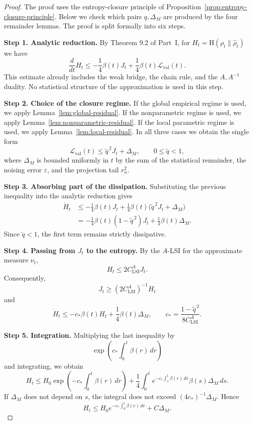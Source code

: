 \documentclass{article}
\newcommand{\Ent}{\mathrm H}
\newcommand{\Eval}{\mathcal L_{\mathrm{val}}}
\begin{document}
\begin{proof}
The proof uses the entropy-closure principle of Proposition~\ref{prop:entropy-closure-principle}. Below we check which pairs \(q,\Delta_M\) are produced by the four remainder lemmas. The proof is split formally into six steps.

\smallskip
\noindent\textbf{Step 1. Analytic reduction.}
By Theorem 9.2 of Part~I, for \(H_t=\Ent(\rho_t\|\hat\rho_t)\) we have
\[
        \frac{d}{dt}H_t
        \le
        -\frac14\beta(t)J_t+\frac14\beta(t)\Eval(t).
\]
This estimate already includes the weak bridge, the chain rule, and the
\(A,A^{-1}\) duality. No statistical structure of the approximation is used in this
step.

\smallskip
\noindent\textbf{Step 2. Choice of the closure regime.}
If the global empirical regime is used, we apply
Lemma~\ref{lem:global-residual}. If the nonparametric regime is used, we apply
Lemma~\ref{lem:nonparametric-residual}. If the local parametric regime is used, we
apply Lemma~\ref{lem:local-residual}. In all three cases we obtain the single form
\[
        \Eval(t)\le \widetilde q^{\,2}J_t+\Delta_M,
        \qquad 0\le \widetilde q<1,
\]
where \(\Delta_M\) is bounded uniformly in \(t\) by the sum of the statistical
remainder, the noising error \(\varepsilon\), and the projection tail \(r_n^2\).

\smallskip
\noindent\textbf{Step 3. Absorbing part of the dissipation.}
Substituting the previous inequality into the analytic reduction gives
\[
\begin{aligned}
        \dot H_t
        &\le
        -\frac14\beta(t)J_t
        +\frac14\beta(t)\bigl(\widetilde q^{\,2}J_t+\Delta_M\bigr)\\
        &=-\frac14\beta(t)(1-\widetilde q^{\,2})J_t
        +\frac14\beta(t)\Delta_M .
\end{aligned}
\]
Since \(\widetilde q<1\), the first term remains strictly dissipative.

\smallskip
\noindent\textbf{Step 4. Passing from \(J_t\) to the entropy.}
By the \(A\)-LSI for the approximate measure \(\hat\nu_t\),
\[
        H_t\le 2C_{\mathrm{LSI}}^A J_t.
\]
Consequently,
\[
        J_t\ge (2C_{\mathrm{LSI}}^A)^{-1}H_t
\]
and
\[
        \dot H_t
        \le
        -c_*\beta(t)H_t+\frac14\beta(t)\Delta_M,
        \qquad
        c_*=\frac{1-\widetilde q^{\,2}}{8C_{\mathrm{LSI}}^A}.
\]

\smallskip
\noindent\textbf{Step 5. Integration.}
Multiplying the last inequality by
\[
        \exp\left(c_*\int_0^t\beta(r)\,dr\right)
\]
and integrating, we obtain
\[
        H_t
        \le
        H_0\exp\left(-c_*\int_0^t\beta(r)\,dr\right)
        +\frac14\int_0^t
        e^{-c_*\int_s^t\beta(r)\,dr}\beta(s)\Delta_M\,ds .
\]
If \(\Delta_M\) does not depend on \(s\), the integral does not exceed
\((4c_*)^{-1}\Delta_M\). Hence
\[
        H_t
        \le
        H_0e^{-c_*\int_0^t\beta(r)\,dr}+C\Delta_M .
\]


\end{proof}
\end{document}
